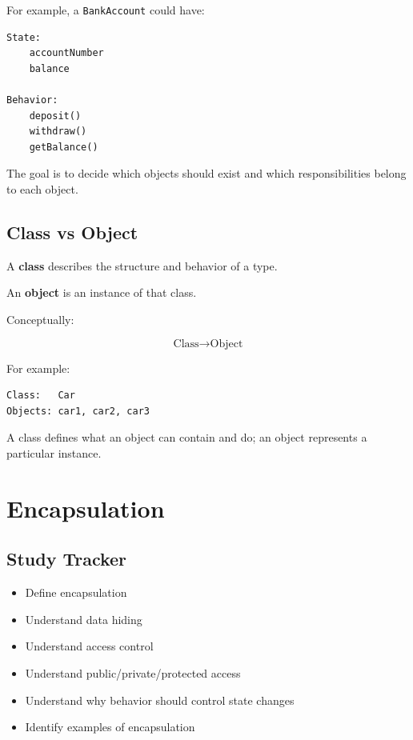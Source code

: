 \documentclass[11pt,a4paper]{article}
\newcommand{\checkitem}{$\square$}
\begin{document}
For example, a \texttt{BankAccount} could have:

\begin{verbatim}
State:
    accountNumber
    balance

Behavior:
    deposit()
    withdraw()
    getBalance()
\end{verbatim}

The goal is to decide which objects should exist and which responsibilities
belong to each object.

\subsection{Class vs Object}

A \textbf{class} describes the structure and behavior of a type.

An \textbf{object} is an instance of that class.

Conceptually:

\[
\text{Class} \rightarrow \text{Object}
\]

For example:

\begin{verbatim}
Class:   Car
Objects: car1, car2, car3
\end{verbatim}

A class defines what an object can contain and do; an object represents a
particular instance.

\section{Encapsulation}

\subsection{Study Tracker}

\begin{itemize}[label=\checkitem]
    \item Define encapsulation
    \item Understand data hiding
    \item Understand access control
    \item Understand public/private/protected access
    \item Understand why behavior should control state changes
    \item Identify examples of encapsulation
\end{itemize}
\end{document}
